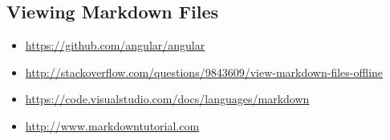 \subsection{Viewing Markdown Files}


\begin{itemize}
  \item \url{https://github.com/angular/angular}
\end{itemize}


\begin{itemize}
  \item \url{http://stackoverflow.com/questions/9843609/view-markdown-files-offline}
\end{itemize}


\begin{itemize}
  \item \url{https://code.visualstudio.com/docs/languages/markdown}
\end{itemize}


\begin{itemize}
  \item \url{http://www.markdowntutorial.com}
\end{itemize}
